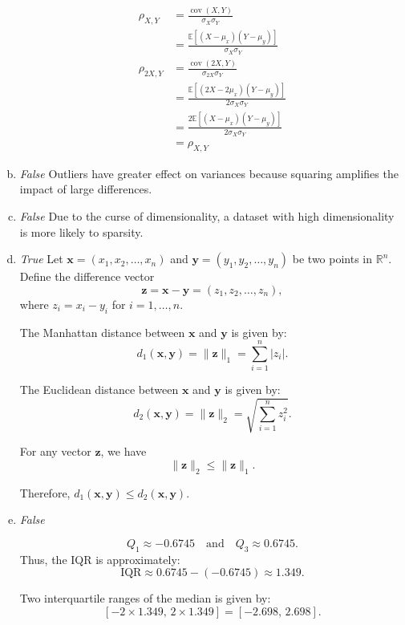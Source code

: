 \documentclass[11pt]{article}
\begin{document}
\begin{enumerate}[a.]
		\begin{align*}
			\rho_{X,Y} &= \frac{\operatorname{cov}(X,Y)}{\sigma_X \sigma_Y}\\
					  &= \frac{\mathbb{E}[(X - \mu_x)(Y - \mu_y)]}{\sigma_X \sigma_Y}\\
			\rho_{2X,Y} &= \frac{\operatorname{cov}(2X,Y)}{\sigma_{2X} \sigma_Y}\\
					  &= \frac{\mathbb{E}[(2X - 2\mu_x)(Y - \mu_y)]}{2\sigma_X \sigma_Y}\\
					  &= \frac{2\mathbb{E}[(X - \mu_x)(Y - \mu_y)]}{2\sigma_X \sigma_Y}\\
					  &= \rho_{X,Y}
		\end{align*}
	\item
		\textit{False}
		Outliers have greater effect on variances because squaring amplifies the impact of large differences. 
	\item
		\textit{False}
		Due to the curse of dimensionality, a dataset with high dimensionality is more likely to sparsity.
	\item
		\textit{True}
		Let \(\mathbf{x} = (x_1, x_2, \ldots, x_n)\) and \(\mathbf{y} = (y_1, y_2, \ldots, y_n)\) be two points in \(\mathbb{R}^n\). Define the difference vector
		\[
			\mathbf{z} = \mathbf{x} - \mathbf{y} = (z_1, z_2, \ldots, z_n),
		\]
		where \(z_i = x_i - y_i\) for \(i = 1, \ldots, n\).

		The Manhattan distance between \(\mathbf{x}\) and \(\mathbf{y}\) is given by:
		\[
			d_1(\mathbf{x}, \mathbf{y}) = \|\mathbf{z}\|_1 = \sum_{i=1}^n |z_i|.
		\]

		The Euclidean distance between \(\mathbf{x}\) and \(\mathbf{y}\) is given by:
		\[
			d_2(\mathbf{x}, \mathbf{y}) = \|\mathbf{z}\|_2 = \sqrt{\sum_{i=1}^n z_i^2}.
		\]

		For any vector \(\mathbf{z}\), we have
		\[
			\|\mathbf{z}\|_2 \leq \|\mathbf{z}\|_1.
		\]

		Therefore, \( d_1(\mathbf{x}, \mathbf{y}) \leq d_2(\mathbf{x}, \mathbf{y}) \).
	\item
		\textit{False}

		\[
			Q_1 \approx -0.6745 \quad \text{and} \quad Q_3 \approx 0.6745.
		\]
		Thus, the IQR is approximately:
		\[
			\text{IQR} \approx 0.6745 - (-0.6745) \approx 1.349.
		\]

		Two interquartile ranges of the median is given by:
		\[
			\left[ -2 \times 1.349, \, 2 \times 1.349 \right] = \left[ -2.698, \, 2.698 \right].
		\]


\end{enumerate}
\end{document}
